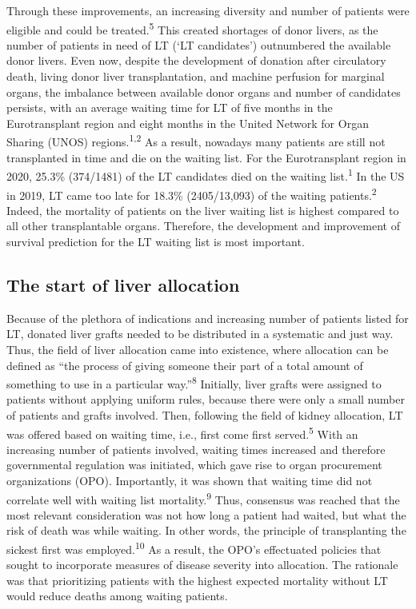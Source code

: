 \documentclass[11pt,english,]{book} %
\begin{document}
Through these improvements, an increasing diversity and number of patients were eligible and could be treated.\textsuperscript{5} This created shortages of donor livers, as the number of patients in need of LT (`LT candidates') outnumbered the available donor livers. Even now, despite the development of donation after circulatory death, living donor liver transplantation, and machine perfusion for marginal organs, the imbalance between available donor organs and number of candidates persists, with an average waiting time for LT of five months in the Eurotransplant region and eight months in the United Network for Organ Sharing (UNOS) regions.\textsuperscript{1,2} As a result, nowadays many patients are still not transplanted in time and die on the waiting list. For the Eurotransplant region in 2020, 25.3\% (374/1481) of the LT candidates died on the waiting list.\textsuperscript{1} In the US in 2019, LT came too late for 18.3\% (2405/13,093) of the waiting patients.\textsuperscript{2} Indeed, the mortality of patients on the liver waiting list is highest compared to all other transplantable organs. Therefore, the development and improvement of survival prediction for the LT waiting list is most important.

\hypertarget{the-start-of-liver-allocation}{%
\subsection*{The start of liver allocation}\label{the-start-of-liver-allocation}}

Because of the plethora of indications and increasing number of patients listed for LT, donated liver grafts needed to be distributed in a systematic and just way. Thus, the field of liver allocation came into existence, where allocation can be defined as ``the process of giving someone their part of a total amount of something to use in a particular way.''\textsuperscript{8}
Initially, liver grafts were assigned to patients without applying uniform rules, because there were only a small number of patients and grafts involved. Then, following the field of kidney allocation, LT was offered based on waiting time, i.e., first come first served.\textsuperscript{5} With an increasing number of patients involved, waiting times increased and therefore governmental regulation was initiated, which gave rise to organ procurement organizations (OPO). Importantly, it was shown that waiting time did not correlate well with waiting list mortality.\textsuperscript{9} Thus, consensus was reached that the most relevant consideration was not how long a patient had waited, but what the risk of death was while waiting. In other words, the principle of transplanting the sickest first was employed.\textsuperscript{10} As a result, the OPO's effectuated policies that sought to incorporate measures of disease severity into allocation. The rationale was that prioritizing patients with the highest expected mortality without LT would reduce deaths among waiting patients.
\end{document}
